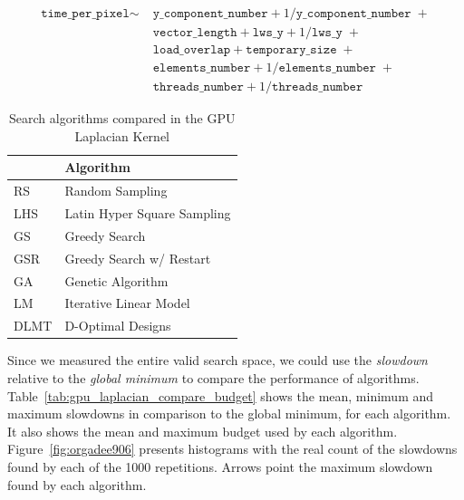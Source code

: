 \documentclass[conference]{IEEEtran}
\begin{document}
{\scriptsize
\begin{align}
\label{eq:gpu_laplacian_performance_model}
\texttt{time\_per\_pixel} \sim & \; \texttt{y\_component\_number} + 1 / \texttt{y\_component\_number} \; + \nonumber \\
& \; \texttt{vector\_length} + \texttt{lws\_y} + 1 / \texttt{lws\_y} \; + \nonumber \\
& \; \texttt{load\_overlap} + \texttt{temporary\_size} \; + \\
& \; \texttt{elements\_number} + 1 / \texttt{elements\_number} \; + \nonumber \\
& \; \texttt{threads\_number} + 1 /\texttt{threads\_number} \nonumber
\end{align}
}

\begin{table}[ht]
\caption{\label{tab:org775381c}
Search algorithms compared in the GPU Laplacian Kernel}
\centering
\footnotesize
\begin{tabular}{ll}
\toprule
 & Algorithm\\
\midrule
RS & Random Sampling\\
LHS & Latin Hyper Square Sampling\\
GS & Greedy Search\\
GSR & Greedy Search w/ Restart\\
GA & Genetic Algorithm\\
LM & Iterative Linear Model\\
DLMT & D-Optimal Designs\\
\bottomrule
\end{tabular}
\end{table}

Since we measured the entire valid search space, we could use the \emph{slowdown}
relative to the \emph{global minimum} to compare the performance of algorithms.
Table~\ref{tab:gpu_laplacian_compare_budget} shows the mean, minimum and
maximum slowdowns in comparison to the global minimum, for each algorithm. It
also shows the mean and maximum budget used by each algorithm.
Figure~\ref{fig:orgadee906} presents histograms with the
real count of the slowdowns found by each of the 1000 repetitions. Arrows point
the maximum slowdown found by each algorithm.
\end{document}
